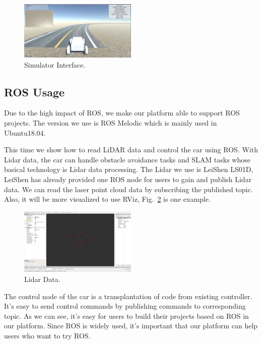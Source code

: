 \documentclass[conference]{IEEEtran}
\begin{document}
\begin{sloppypar}
\begin{figure}[htbp]
\centerline{\includegraphics[width=0.5\textwidth]{simulator.png}}
\caption{Simulator Interface.}
\label{si}
\end{figure}

\subsection{ROS Usage}
Due to the high impact of ROS, we make our platform able to support ROS projects. The version we use is ROS Melodic\cite{b35} which is mainly used in Ubuntu18.04. 

This time we show how to read LiDAR data and control the car using ROS. With Lidar data, the car can handle obstacle avoidance tasks and SLAM\cite{b36} tasks whose basical technology is Lidar data processing.
The Lidar we use is LeiShen LS01D\cite{b37}, LeiShen has already provided one ROS node for users to gain and publish Lidar data. We can read the  laser point cloud data by subscribing the published topic. Also, it will be more visualized to use RViz\cite{b38}, Fig.~\ref{ld} is one example.

\begin{figure}[htbp]
\centerline{\includegraphics[width=0.5\textwidth]{laser.png}}
\caption{Lidar Data.}
\label{ld}
\end{figure}

The control node of the car is a transplantation of code from existing controller. It's easy to send control commands by publishing commands to corresponding topic. As we can see, it's easy for users to build their projects based on ROS in our platform. Since ROS is widely used, it's important that our platform can help users who want to try ROS.


\end{sloppypar}
\end{document}
